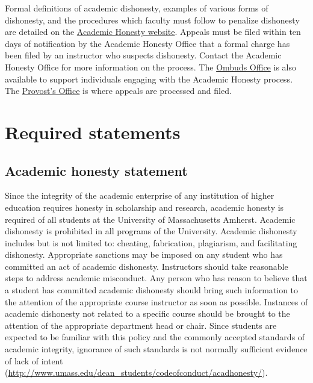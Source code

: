 \documentclass[11pt]{article}
\begin{document}
Formal definitions of academic dishonesty, examples of various forms of
dishonesty, and the procedures which faculty must follow to penalize dishonesty
are detailed on the \href{https://www.umass.edu/studentsuccess/academic-integrity}{Academic Honesty website}. Appeals must be filed within ten
days of notification by the Academic Honesty Office that a formal charge has
been filed by an instructor who suspects dishonesty. Contact the Academic
Honesty Office for more information on the process. The \href{https://www.umass.edu/ombuds/}{Ombuds Office} is also
available to support individuals engaging with the Academic Honesty process.
The \href{https://www.umass.edu/provost/}{Provost’s Office} is where appeals are processed and filed.

\section*{Required statements}
\label{sec:org02bb353}
\subsection*{Academic honesty statement}
\label{sec:org25f0635}
Since the integrity of the academic enterprise of any institution of higher
education requires honesty in scholarship and research, academic honesty is
required of all students at the University of Massachusetts Amherst. Academic
dishonesty is prohibited in all programs of the University. Academic dishonesty
includes but is not limited to: cheating, fabrication, plagiarism, and
facilitating dishonesty. Appropriate sanctions may be imposed on any student
who has committed an act of academic dishonesty. Instructors should take
reasonable steps to address academic misconduct. Any person who has reason to
believe that a student has committed academic dishonesty should bring such
information to the attention of the appropriate course instructor as soon as
possible. Instances of academic dishonesty not related to a specific course
should be brought to the attention of the appropriate department head or chair.
Since students are expected to be familiar with this policy and the commonly
accepted standards of academic integrity, ignorance of such standards is not
normally sufficient evidence of lack of intent
(\url{http://www.umass.edu/dean\_students/codeofconduct/acadhonesty/}).
\end{document}
